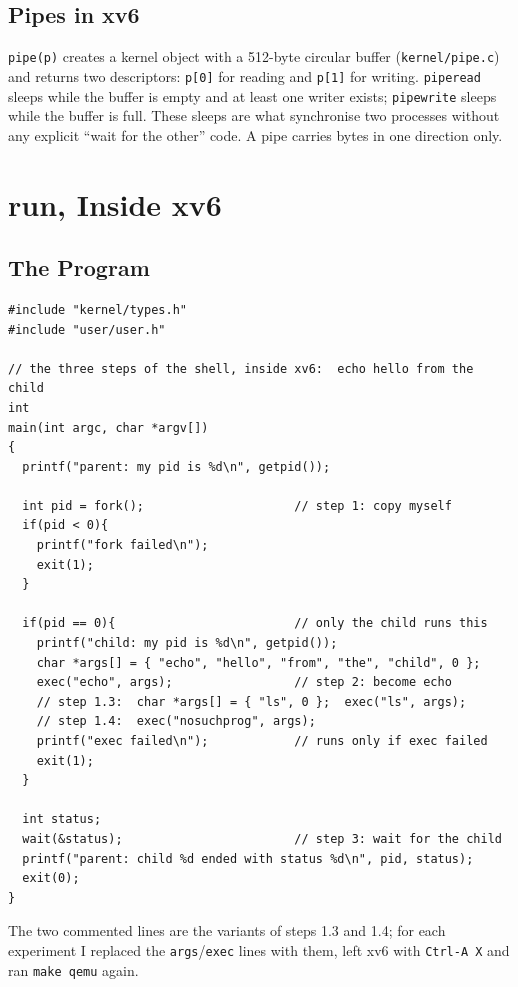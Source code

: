 \documentclass[12pt,a4paper]{article}
\begin{document}
\subsection{Pipes in xv6}

\texttt{pipe(p)} creates a kernel object with a 512-byte circular buffer (\texttt{kernel/pipe.c}) and returns two descriptors: \texttt{p[0]} for reading and \texttt{p[1]} for writing. \texttt{piperead} sleeps while the buffer is empty and at least one writer exists; \texttt{pipewrite} sleeps while the buffer is full. These sleeps are what synchronise two processes without any explicit ``wait for the other'' code. A pipe carries bytes in one direction only.

\newpage
\section{run, Inside xv6}

\subsection{The Program}

\begin{lstlisting}[style=code,caption={user/run.c}]
#include "kernel/types.h"
#include "user/user.h"

// the three steps of the shell, inside xv6:  echo hello from the child
int
main(int argc, char *argv[])
{
  printf("parent: my pid is %d\n", getpid());

  int pid = fork();                     // step 1: copy myself
  if(pid < 0){
    printf("fork failed\n");
    exit(1);
  }

  if(pid == 0){                         // only the child runs this
    printf("child: my pid is %d\n", getpid());
    char *args[] = { "echo", "hello", "from", "the", "child", 0 };
    exec("echo", args);                 // step 2: become echo
    // step 1.3:  char *args[] = { "ls", 0 };  exec("ls", args);
    // step 1.4:  exec("nosuchprog", args);
    printf("exec failed\n");            // runs only if exec failed
    exit(1);
  }

  int status;
  wait(&status);                        // step 3: wait for the child
  printf("parent: child %d ended with status %d\n", pid, status);
  exit(0);
}
\end{lstlisting}

The two commented lines are the variants of steps 1.3 and 1.4; for each experiment I replaced the \texttt{args}/\texttt{exec} lines with them, left xv6 with \texttt{Ctrl-A X} and ran \texttt{make qemu} again.
\end{document}
